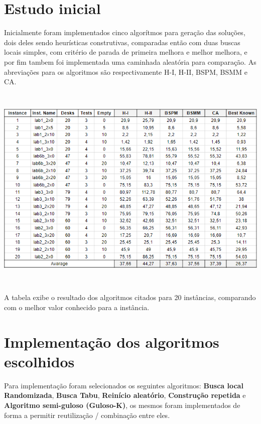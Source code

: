 \documentclass[a4paper,11pt]{article}
\begin{document}
\section{Estudo inicial}

Inicialmente foram implementados cinco algor\'itmos para gera\c c\~ao das solu\c c\~oes, dois deles sendo heur\'isticas construtivas, comparadas ent\~ao com duas buscas locais simples, com crit\'erio de parada de primeira melhora e melhor melhora, e por fim tambem foi implementada uma caminhada aleat\'oria para compara\c c\~ao. As abrevia\c c\~oes para os algoritmos s\~ao respectivamente H-I, H-II, BSPM, BSMM e CA.

\vspace{10pt}
\includegraphics[width=14cm, height=10cm]{tabela 1.png}
\newline

A tabela exibe o resultado dos algoritmos citados para 20 inst\^ancias, comparando com o melhor valor conhecido para a inst\^ancia.



\section{ Implementa\c c\~ao dos algoritmos escolhidos }

Para implementa\c c\~ao foram selecionados os seguintes algoritmos: \textbf{Busca local Randomizada}, \textbf{Busca Tabu}, \textbf{Rein\'icio aleat\'orio}, \textbf{Constru\c c\~ao repetida} e \textbf{Algoritmo semi-guloso (Guloso-K)}, os mesmos foram implementados de forma a permitir reutiliza\c c\~ao / combina\c c\~ao entre eles.
\end{document}
